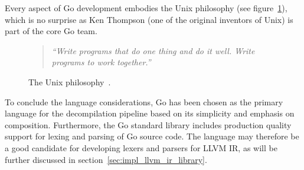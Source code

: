 Every aspect of Go development embodies the Unix philosophy (see figure~\ref{fig:unix_philosophy}), which is no surprise as Ken Thompson (one of the original inventors of Unix) is part of the core Go team.

\begin{figure}[htbp]
	\begin{center}
		\begin{quote}
			\textit{``Write programs that do one thing and do it well. Write programs to work together.''}
		\end{quote}
		\caption{The Unix philosophy~\cite{art_of_unix}.}
		\label{fig:unix_philosophy}
	\end{center}
\end{figure}

To conclude the language considerations, Go has been chosen as the primary language for the decompilation pipeline based on its simplicity and emphasis on composition. Furthermore, the Go standard library includes production quality support for lexing and parsing of Go source code. The language may therefore be a good candidate for developing lexers and parsers for LLVM IR, as will be further discussed in section~\ref{sec:impl_llvm_ir_library}.
